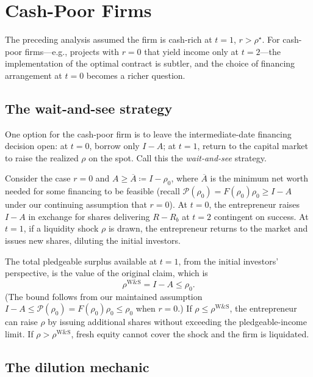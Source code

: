 \documentclass[11pt,a4paper,oneside]{book}
\def\leq{\leqslant}
\def\geq{\geqslant}
\theoremstyle{plain}
\theoremstyle{definition}
\theoremstyle{remark}
\numberwithin{equation}{chapter}
\begin{document}
\section{Cash-Poor Firms}
\label{sec:ML-cash-poor}

The preceding analysis assumed the firm is cash-rich at $t=1$, $r > \rho^\star$.
For cash-poor firms---e.g., projects with $r = 0$ that yield income only at $t=2$---the implementation of the optimal contract is subtler, and the choice of financing arrangement at $t=0$ becomes a richer question.

\subsection{The wait-and-see strategy}

One option for the cash-poor firm is to leave the intermediate-date financing decision open: at $t=0$, borrow only $I - A$; at $t=1$, return to the capital market to raise the realized $\rho$ on the spot.
Call this the \emph{wait-and-see} strategy.

Consider the case $r = 0$ and $A \geq \overline{A} \coloneqq I - \rho_0$, where $\overline{A}$ is the minimum net worth needed for some financing to be feasible (recall $\mathcal{P}(\rho_0) = F(\rho_0) \rho_0 \geq I - A$ under our continuing assumption that $r = 0$).
At $t=0$, the entrepreneur raises $I - A$ in exchange for shares delivering $R - R_b$ at $t=2$ contingent on success.
At $t=1$, if a liquidity shock $\rho$ is drawn, the entrepreneur returns to the market and issues new shares, diluting the initial investors.

The total pledgeable surplus available at $t=1$, from the initial investors' perspective, is the value of the original claim, which is
\begin{equation*}
  \rho^{\text{W\&S}} = I - A \leq \rho_0.
\end{equation*}
(The bound follows from our maintained assumption $I - A \leq \mathcal{P}(\rho_0) = F(\rho_0)\rho_0 \leq \rho_0$ when $r = 0$.)
If $\rho \leq \rho^{\text{W\&S}}$, the entrepreneur can raise $\rho$ by issuing additional shares without exceeding the pledgeable-income limit.
If $\rho > \rho^{\text{W\&S}}$, fresh equity cannot cover the shock and the firm is liquidated.

\subsection{The dilution mechanic}
\end{document}
